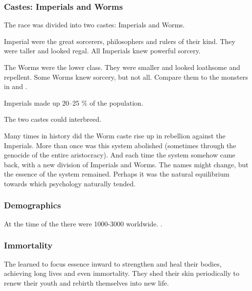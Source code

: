 \subsubsection{Castes: Imperials and Worms}
The \ophidian race was divided into two castes: 
Imperials and Worms.

Imperial \ophidians were the great sorcerers, philosophers and rulers of their kind.
They were taller and looked regal.
All Imperials knew powerful sorcery.

The Worms were the lower class. 
They were smaller and looked loathsome and repellent.
Some Worms knew sorcery, but not all. 
Compare them to the monsters in \cite{RobertEHoward:TheShadowKingdom} and \cite{RobertEHoward:WormsoftheEarth}. 

Imperials made up 20--25 \% of the \ophidian population.

The two castes could interbreed.

Many times in \ophidian history did the Worm caste rise up in rebellion against the Imperials.
More than once was this system abolished (sometimes through the genocide of the entire aristocracy).
And each time the system somehow came back, with a new division of Imperials and Worms. 
The names might change, but the essence of the system remained.
Perhaps it was the natural equilibrium towards which \ophidian psychology naturally tended.





\subsubsection{Demographics}
At the time of the \thirdbanewar there were 1000-3000 \ophidians worldwide. 
.





\subsubsection{Immortality}
The \ophidian {} learned to focus \nexus essence inward to strengthen and heal their bodies, achieving long lives and even immortality. 
They shed their skin periodically to renew their youth and rebirth themselves into new life. 

